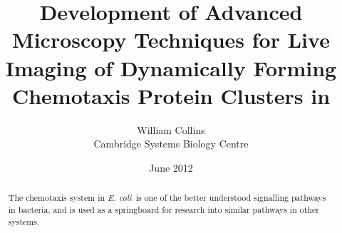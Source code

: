 \documentclass[12pt]{article}
\title{Development of Advanced Microscopy Techniques for Live Imaging of Dynamically Forming Chemotaxis Protein Clusters in \ecoli}
\date{June 2012}
\author{William Collins\\Cambridge Systems Biology Centre}
\newcommand{\ecoli}{\textit{E. coli~}}			%
\begin{document}
\maketitle
\begin{abstract}
The chemotaxis system in \ecoli is one of the better understood signalling pathways in bacteria, and is used as a springboard for research into similar pathways in other systems.
\end{abstract}
\newpage
\tableofcontents
\cleardoublepage

\cleardoublepage


\cleardoublepage


\cleardoublepage


\cleardoublepage


\cleardoublepage

\appendix

\cleardoublepage


\cleardoublepage

\printbibliography
\end{document}
